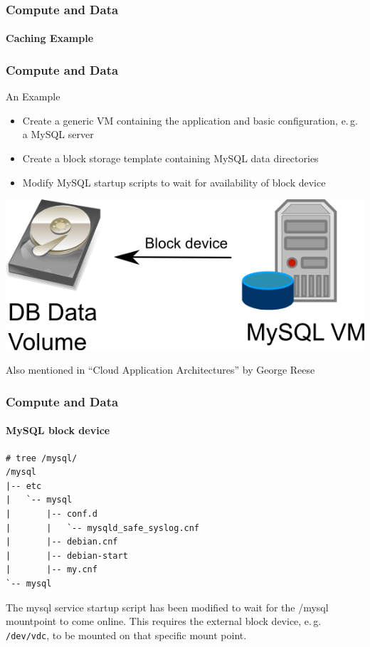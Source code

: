 \begin{frame}
\frametitle{Compute and Data}
\framesubtitle{Caching Example}
\end{frame}


\begin{frame}
\frametitle{Compute and Data}
An Example
\begin{itemize}
\item Create a generic VM containing the application and basic
  configuration, e.\,g. a MySQL server
\item Create a block storage template containing MySQL data directories
\item Modify MySQL startup scripts to wait for availability of block device
\end{itemize}
\begin{center}
\includegraphics[width=.4\textwidth]{images/DBaaS.png}
\end{center}
\hfill\tiny Also mentioned in ``Cloud Application Architectures'' by George Reese
\end{frame}

\begin{frame}[fragile]
\frametitle{Compute and Data}
\framesubtitle{MySQL block device}
\begin{lstlisting}
# tree /mysql/
/mysql
|-- etc
|   `-- mysql
|       |-- conf.d
|       |   `-- mysqld_safe_syslog.cnf
|       |-- debian.cnf
|       |-- debian-start
|       |-- my.cnf
`-- mysql
\end{lstlisting}
The mysql service startup script has been modified to wait for the
/mysql mountpoint to come online. This requires the external block
device, e.\,g. \texttt{/dev/vdc}, to be mounted on that specific mount
point.
\end{frame}


